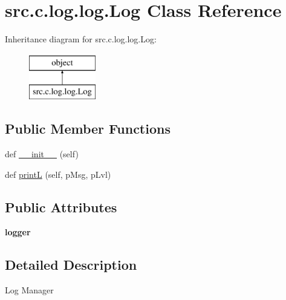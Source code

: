 \hypertarget{classsrc_1_1c_1_1log_1_1log_1_1_log}{}\section{src.\+c.\+log.\+log.\+Log Class Reference}
\label{classsrc_1_1c_1_1log_1_1log_1_1_log}
Inheritance diagram for src.\+c.\+log.\+log.\+Log\+:\begin{figure}[H]
\begin{center}
\leavevmode
\includegraphics[height=2.000000cm]{classsrc_1_1c_1_1log_1_1log_1_1_log}
\end{center}
\end{figure}
\subsection*{Public Member Functions}
\begin{DoxyCompactItemize}
\item 
def \hyperlink{classsrc_1_1c_1_1log_1_1log_1_1_log_af6c94de9c03a3a67eaa0dcfd926cc3b5}{\+\_\+\+\_\+init\+\_\+\+\_\+} (self)
\item 
def \hyperlink{classsrc_1_1c_1_1log_1_1log_1_1_log_aa6ef4c0876fe95d94b189279fc3661af}{print\+L} (self, p\+Msg, p\+Lvl)
\end{DoxyCompactItemize}
\subsection*{Public Attributes}
\begin{DoxyCompactItemize}
\item 
\hypertarget{classsrc_1_1c_1_1log_1_1log_1_1_log_a036bbf3347a9788446688779e78dbf97}{}{\bfseries logger}\label{classsrc_1_1c_1_1log_1_1log_1_1_log_a036bbf3347a9788446688779e78dbf97}

\end{DoxyCompactItemize}


\subsection{Detailed Description}
\begin{DoxyVerb}Log Manager
\end{DoxyVerb}
 

